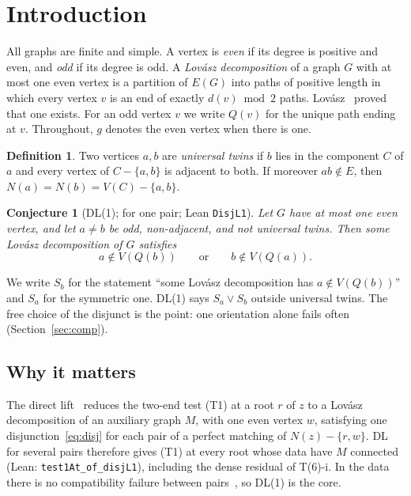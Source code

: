 \documentclass[11pt]{amsart}
\newtheorem{conjecture}[theorem]{Conjecture}
\theoremstyle{definition}
\newtheorem{definition}[theorem]{Definition}
\newcommand{\lean}[1]{\quad{\footnotesize[Lean: \texttt{#1}]}}
\begin{document}
\section{Introduction}\label{sec:intro}

All graphs are finite and simple. A vertex is \emph{even} if its degree is positive and even, and
\emph{odd} if its degree is odd. A \emph{Lov\'asz decomposition} of a graph $G$ with at most one even
vertex is a partition of $E(G)$ into paths of positive length in which every vertex $v$ is an end of
exactly $d(v)\bmod2$ paths. Lov\'asz~\cite{L68} proved that one exists. For an odd vertex $v$ we
write $Q(v)$ for the unique path ending at $v$. Throughout, $g$ denotes the even vertex when there is
one.

\begin{definition}\label{def:twins}
Two vertices $a,b$ are \emph{universal twins} if $b$ lies in the component $C$ of $a$ and every vertex
of $C-\{a,b\}$ is adjacent to both. If moreover $ab\notin E$, then $N(a)=N(b)=V(C)-\{a,b\}$.
\lean{UnivTwins}
\end{definition}

\begin{conjecture}[DL(1); {\cite[Conjecture~7.3]{DT}} for one pair; Lean \texttt{DisjL1}]\label{conj:dl}
Let $G$ have at most one even vertex, and let $a\ne b$ be odd, non-adjacent, and not universal twins.
Then some Lov\'asz decomposition of $G$ satisfies
\begin{equation}\label{eq:disj}
a\notin V(Q(b))\qquad\text{or}\qquad b\notin V(Q(a)).
\end{equation}
\end{conjecture}

We write $S_b$ for the statement ``some Lov\'asz decomposition has $a\notin V(Q(b))$'' and $S_a$ for
the symmetric one. DL(1) says $S_a\vee S_b$ outside universal twins. The free choice of the
disjunct is the point: one orientation alone fails often (Section~\ref{sec:comp}).

\subsection*{Why it matters}
The direct lift~\cite[Theorem~2.1]{DT} reduces the two-end test (T1) at a root $r$ of $z$ to a
Lov\'asz decomposition of an auxiliary graph $M$, with one even vertex $w$, satisfying one
disjunction~\eqref{eq:disj} for each pair of a perfect matching of $N(z)-\{r,w\}$. DL for several
pairs therefore gives (T1) at every root whose data have $M$ connected~\cite[Prop.~7.4]{DT}
(Lean: \texttt{test1At\_of\_disjL1}), including the dense residual of T(6)-i. In the data there is no
compatibility failure between pairs~\cite[\S7.3]{DT}, so DL(1) is the core.
\end{document}
